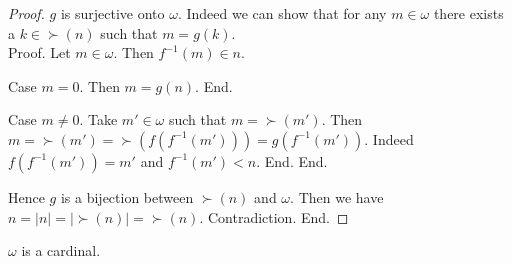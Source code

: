 \documentclass[10pt]{article}
\begin{document}
\begin{forthel}
\begin{proof}
        $g$ is surjective onto $\omega$.
        Indeed we can show that for any $m \in \omega$ there exists a $k \in \succ(n)$ such that $m = g(k)$. \\
        Proof.
          Let $m \in \omega$.
          Then $f^{-1}(m) \in n$.

          Case $m = 0$.
            Then $m = g(n)$.
          End.

          Case $m \neq 0$.
            Take $m' \in \omega$ such that $m = \succ(m')$.
            Then $m
              = \succ(m')
              = \succ(f(f^{-1}(m')))
              = g(f^{-1}(m'))$.
            Indeed $f(f^{-1}(m')) = m'$ and $f^{-1}(m') < n$.
          End.
        End.

        Hence $g$ is a bijection between $\succ(n)$ and $\omega$.
        Then we have $n
          = |n|
          = |\succ(n)|
          = \succ(n)$.
        Contradiction.
      End.
    \end{proof}
  \end{forthel}

  \begin{forthel}
    \begin{corollary}[id=SET_THEORY_07_2717623053713408,printid]
      $\omega$ is a cardinal.
    \end{corollary}
  \end{forthel}
\end{document}

